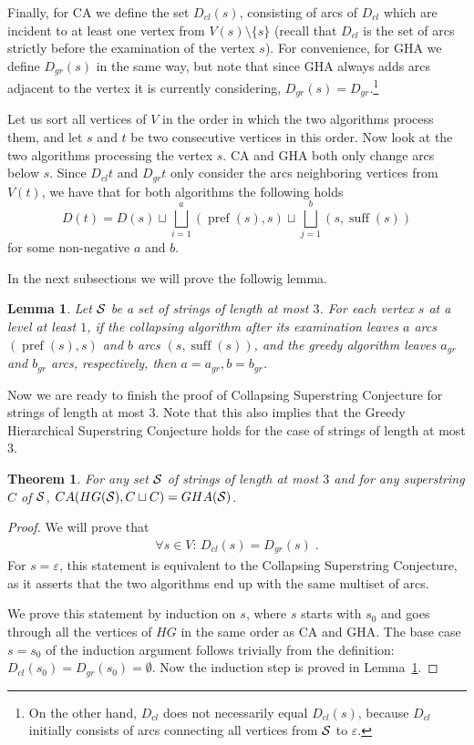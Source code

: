 \documentclass[11pt]{article}
\newtheorem{lemma}{Lemma}
\newtheorem{theorem}{Theorem}
\DeclareMathOperator{\pref}{pref}
\DeclareMathOperator{\suff}{suff}
\newcommand{\cld}{D_{cl}}
\newcommand{\grd}{D_{gr}}
\newcommand{\cldr}[1]{D_{cl}(#1)}
\newcommand{\grdr}[1]{D_{gr}(#1)}
\begin{document}
Finally, for CA we define the set $\cldr{s}$, consisting of arcs of $\cld{}$ which are incident to at least one vertex from $ V (s) \setminus \{s \} $ (recall that $\cld{}$ is the set of arcs strictly before the examination of the vertex $s$). For convenience, for GHA we define $\grdr{s}$ in the same way, but note that since GHA always adds arcs adjacent to the vertex it is currently considering, $\grdr{s}=\grd$.\footnote{On the other hand, $\cld$ does not necessarily equal $\cldr{s}$, because $\cld{}$ initially consists of arcs connecting all vertices from $ {\cal S} $ to $\varepsilon$.}

Let us sort all vertices of $V$ in the order in which the two algorithms process them, and let $s$ and $t$ be two consecutive vertices in this order. Now look at the two algorithms processing the vertex $s$. CA and GHA both only change arcs below $s$. Since $\cld{t}$ and $\grd{t}$ only consider the arcs neighboring vertices from $V(t)$, we have that for both algorithms the following holds
\begin{equation}
\label{eqn:stepcase}
    D(t) = D(s) \sqcup \bigsqcup_{i=1}^{a} (\pref(s), s) \sqcup \bigsqcup_{j=1}^{b} (s, \suff(s))
\end{equation}
for some non-negative $ a $ and $ b $.

In the next subsections we will prove the followig lemma.
\begin{lemma}
\label{lem:technical}
Let ${\cal S}$ be a set of strings of length at most $3$. For each vertex $ s $ at a level at least $1$, if the collapsing algorithm after its examination leaves $ a $ arcs $ (\pref (s), s) $ and $ b$ arcs $ (s, \suff(s) ) $, and the greedy algorithm leaves $ a_{gr} $ and $ b_{gr} $ arcs, respectively, then $ a = a_{gr}, b = b_{gr} $.
\end{lemma}

Now we are ready to finish the proof of Collapsing Superstring Conjecture for strings of length at most $3$. Note that this also implies that the Greedy Hierarchical Superstring Conjecture holds for the case of strings of length at most $3$.

\begin{theorem}
\label{thm:main}
For any set ${\cal S}$ of strings of length at most $3$ and for any superstring $C$ of ${\cal S}$, $CA(HG({\cal S}), C \sqcup C) = GHA({\cal S})$.
\end{theorem}

\begin{proof}
We will prove that
\begin{align*}
\forall s \in V\colon\, \cldr{s}=\grdr{s} \; .
\end{align*}
For $s=\varepsilon$, this statement is equivalent to the Collapsing Superstring Conjecture, as it asserts that the two algorithms end up with the same multiset of arcs. 

We prove this statement by induction on $s$, where $s$ starts with $s_0$ and goes through all the vertices of $HG$ in the same order as CA and GHA. The base case $s=s_0$ of the induction argument follows trivially from the definition: $\cldr{s_0}=\grdr{s_0}=\emptyset$. Now the induction step is proved in Lemma~\ref{lem:technical}.
\end{proof}


\end{document}

